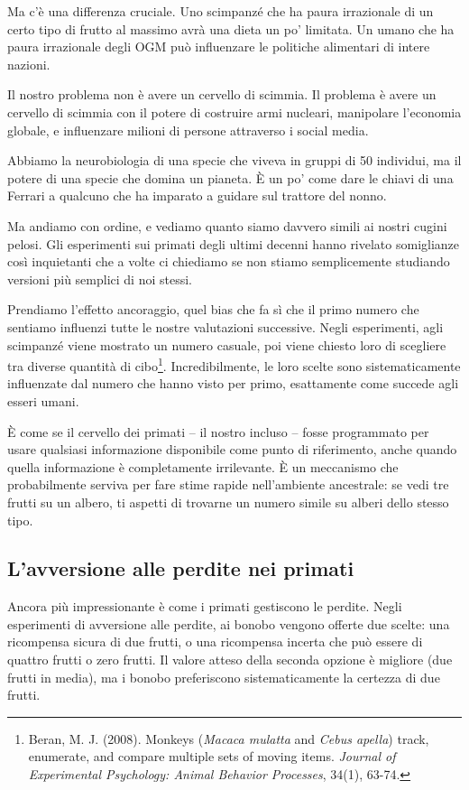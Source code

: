Ma c'è una differenza cruciale. Uno scimpanzé che ha paura irrazionale di un certo tipo di frutto al massimo avrà una dieta un po' limitata. Un umano che ha paura irrazionale degli OGM può influenzare le politiche alimentari di intere nazioni.

Il nostro problema non è avere un cervello di scimmia. Il problema è avere un cervello di scimmia con il potere di costruire armi nucleari, manipolare l'economia globale, e influenzare milioni di persone attraverso i social media.

Abbiamo la neurobiologia di una specie che viveva in gruppi di 50 individui, ma il potere di una specie che domina un pianeta. È un po' come dare le chiavi di una Ferrari a qualcuno che ha imparato a guidare sul trattore del nonno.

Ma andiamo con ordine, e vediamo quanto siamo davvero simili ai nostri cugini pelosi. Gli esperimenti sui primati degli ultimi decenni hanno rivelato somiglianze così inquietanti che a volte ci chiediamo se non stiamo semplicemente studiando versioni più semplici di noi stessi.

Prendiamo l'effetto ancoraggio, quel bias che fa sì che il primo numero che sentiamo influenzi tutte le nostre valutazioni successive. Negli esperimenti, agli scimpanzé viene mostrato un numero casuale, poi viene chiesto loro di scegliere tra diverse quantità di cibo\footnote{Beran, M. J. (2008). Monkeys (\emph{Macaca mulatta} and \emph{Cebus apella}) track, enumerate, and compare multiple sets of moving items. \emph{Journal of Experimental Psychology: Animal Behavior Processes}, 34(1), 63-74.}. Incredibilmente, le loro scelte sono sistematicamente influenzate dal numero che hanno visto per primo, esattamente come succede agli esseri umani.

È come se il cervello dei primati -- il nostro incluso -- fosse programmato per usare qualsiasi informazione disponibile come punto di riferimento, anche quando quella informazione è completamente irrilevante. È un meccanismo che probabilmente serviva per fare stime rapide nell'ambiente ancestrale: se vedi tre frutti su un albero, ti aspetti di trovarne un numero simile su alberi dello stesso tipo.

\subsection{L'avversione alle perdite nei primati}

Ancora più impressionante è come i primati gestiscono le perdite. Negli esperimenti di avversione alle perdite, ai bonobo vengono offerte due scelte: una ricompensa sicura di due frutti, o una ricompensa incerta che può essere di quattro frutti o zero frutti. Il valore atteso della seconda opzione è migliore (due frutti in media), ma i bonobo preferiscono sistematicamente la certezza di due frutti.

